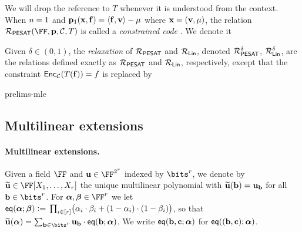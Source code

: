 \fi
We will drop the reference to $T$ whenever it is understood from the context. When $n=1$ and $\mathbf{p}_1(\mathbf{x},\mathbf{f})= \langle \mathbf{f}, \mathbf{v}\rangle -\mu$ where $\mathbf{x}=(\mathbf{v},\mu)$, the relation $\PESAT(\FF,\pp, \cC, T)$ is called a \emph{constrained code} \cite{whir}.  We denote it 
%
\begin{definition}Given $\delta \in (0,1)$, the \emph{relaxation} of $\mathcal{R}_{\mathsf{PESAT}}$ and $\mathcal{R}_{\mathsf{Lin}}$, denoted
%
\iflncs
$\mathcal{R}_{\mathsf{PESAT}}^\delta$, $\mathcal{R}_{\mathsf{Lin}}^{\delta}$,
\else
\lncsmath{
\PESAT^\delta, \qquad \qquad \LIN^{\delta}
}
\fi
%
are the relations defined exactly as $\mathcal{R}_{\mathsf{PESAT}}$ and $\mathcal{R}_{\mathsf{Lin}}$, respectively, except that the constraint $\mathsf{Enc}_{\mathcal{C}}(T(\mathbf{f}))=f$ is replaced by
%
\end{definition}

\begin{lncsappendix}{prelims-mle}
\iflncs\subsection{Multilinear extensions}\label{a:prelims_mle}\else\paragraph{Multilinear extensions.}\fi{}  Given a field $\FF$ and $\uu\in \FF^{2^r}$ indexed by $\bits^r$, we denote by $\mle{\uu}\in \FF[X_1,\ldots,X_r]$  the unique multilinear polynomial with ${\widetilde{\mathbf{u}}}(\mathbf{b})=\mathbf{u}_{\mathbf{b}}$ for all $\bb\in\bits^r$. For $\bm\alpha,\bm\beta\in\FF^r$ we let $\mathsf{eq}(\bm\alpha;\bm\beta){\;\vcentcolon=\;} \prod_{i\in[r]}\bigl(\alpha_i\cdot \beta_i+(1-\alpha_i)\cdot (1-\beta_i)\bigr)$, so that $\mle{\uu}(\bm\alpha)=\sum_{\bb\in\bits^r}\uu_\bb\cdot \eq(\bb;\bm\alpha)$. We write $\mathsf{eq}(\mathbf{b},\mathbf{c};\bm\alpha)$ for $\mathsf{eq}((\mathbf{b},\mathbf{c});\bm\alpha)$.
\end{lncsappendix}



